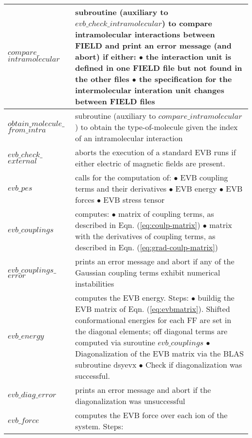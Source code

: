 \begin{center}
\begin{longtable*}[t]{p{0.15\textwidth}|p{0.85\textwidth}}
\hline 
$compare\_$ $intramolecular$ &
subroutine (auxiliary to $evb\_check\_intramolecular$) to compare intramolecular
 interactions between FIELD and print an error message (and abort) if either:\newline
$\bullet$ the interaction unit is defined in one FIELD file but not found in the other files\newline
$\bullet$ the specification for the intermolecular interation unit changes between FIELD files\\
\hline 
$obtain\_molecule\_$ $from\_intra$ & subroutine (auxiliary to $compare\_intramolecular$) to obtain the
type-of-molecule given the index of an intramolecular interaction\\
\hline 
$evb\_check\_$ $external$ &  aborts the execution of a standard EVB runs
 if either electric of magnetic fields are present.
\\
\hline 
$evb\_pes$ & calls for the computation of:\newline
$\bullet$ EVB coupling terms and their derivatives\newline
$\bullet$ EVB energy\newline
$\bullet$ EVB forces\newline
$\bullet$ EVB stress tensor\\
\hline 
$evb\_couplings$ &
computes:\newline
$\bullet$ matrix of coupling terms, as described in Eqn. (\ref{eq:coulp-matrix})\newline
$\bullet$ matrix with the derivatives of coupling terms, as described in Eqn. (\ref{eq:grad-coulp-matrix})\\
\hline
$evb\_couplings\_$ $error$ & prints an error message and abort if any of the Gaussian
coupling terms exhibit numerical instabilities\\
\hline 
$evb\_energy$ & computes the EVB energy. Steps:\newline
$\bullet$ buildig the EVB matrix of Eqn. (\ref{eq:evbmatrix}). Shifted conformational energies for each FF are set in the diagonal elements; off diagonal terms are computed via suroutine $evb\_couplings$\newline
$\bullet$ Diagonalization of the EVB matrix via the BLAS subroutine dsyevx\newline
$\bullet$ Check if diagonalization was successful. \\
\hline
$evb\_diag\_error$ & prints an error message and abort if the diagonalization was unsuccessful \\
\hline 
$evb\_force$ & computes the EVB force over each ion of the system. Steps:\newline

\end{longtable*}
\end{center}
